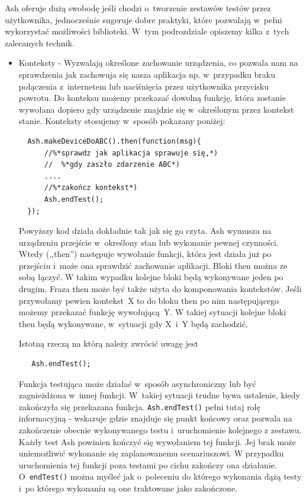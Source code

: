 \documentclass[brudnopis]{xmgr}
\begin{document}
Ash oferuje dużą swobodę jeśli chodzi o~tworzenie zestawów testów przez użytkownika, jednocześnie sugeruje dobre praktyki, które pozwalają w~pełni wykorzystać możliwości biblioteki. W~tym podrozdziale opiszemy kilka z~tych zalecanych technik.    

\begin{itemize}
  \item Konteksty - Wyzwalają określone zachowanie urządzenia, co pozwala nam na sprawdzenia jak zachowuja się nasza aplikacja np. w~przypadku braku połączenia z~internetem lub naciśnięcia przez użytkownika przycisku powrotu. Do konteksu możemy przekazać dowolną funkcję, która zostanie wywołana dopiero gdy urządzenie znajdzie się w~określonym przez kontekst stanie. Konteksty stosujemy w~sposób pokazany poniżej:

\begin{lstlisting}
  Ash.makeDeviceDoABC().then(function(msg){
      //%*sprawdz jak aplikacja sprawuje się,*) 
      //  %*gdy zaszło zdarzenie ABC*)
      ....
      //%*zakończ kontekst*)
      Ash.endTest();
  });
\end{lstlisting}

Powyższy kod działa dokładnie tak jak się go czyta. Ash wymusza na urządzeniu przejście w~określony stan lub wykonanie pewnej czynności. Wtedy (,,then'') następuje wywołanie funkcji, która jest działa już po przejściu i~może ona sprawdzić zachowanie aplikacji. Bloki then można ze sobą łączyć. W takim wypadku kolejne bloki będą wykonywane jeden po drugim. Fraza then może być także użyta do komponowania kontekstów. Jeśli przywołamy pewien kontekst~X to do bloku then po nim następującego możemy przekazać funkcję wywołującą~Y. W takiej sytuacji kolejne bloki then będą wykonywane, w~sytuacji gdy X~i~Y będą zachodzić.  

Istotną rzeczą na którą należy zwrócić uwagę jest 

\begin{lstlisting}
   Ash.endTest();
\end{lstlisting}

Funkcja testująca może działać w~sposób asynchroniczny lub być zagnieżdżona w~innej funkcji. W~takiej sytuacji trudne bywa ustalenie, kiedy zakończyła się przekazana funkcja. \texttt{Ash.endTest()} pełni tutaj rolę informacyjną - wskazuje gdzie znajduje się punkt końcowy oraz pozwala na zakończenie obecnie wykonywanego testu i~uruchomienie kolejnego z zestawu. Każdy test Ash powinien kończyć się wywołaniem tej funkcji. Jej brak może uniemożliwić wykonanie się zaplanowanemu scenariuszowi. W przypadku uruchomienia tej funkcji poza testami po cichu zakończy ona działanie. O~\texttt{endTest()} można myśleć jak o~poleceniu do którego wykonania dążą testy i~po którego wykonaniu są one traktowane jako zakończone. 


\end{itemize}
\end{document}

